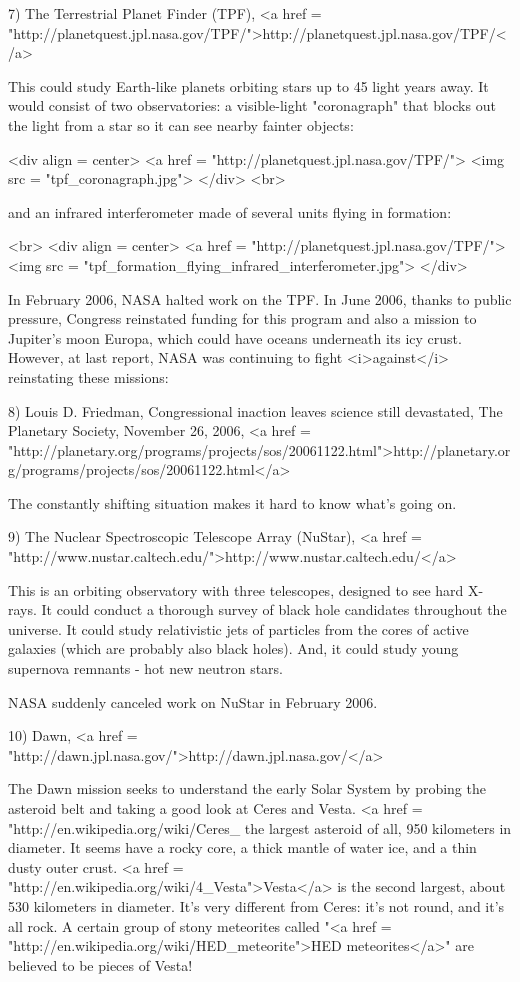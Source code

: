 7) The Terrestrial Planet Finder (TPF),
<a href = "http://planetquest.jpl.nasa.gov/TPF/">http://planetquest.jpl.nasa.gov/TPF/</a>

This could study Earth-like planets orbiting stars up to 45 light
years away.  It would consist of two observatories: a visible-light
"coronagraph" that blocks out the light from a star so it
can see nearby fainter objects:

<div align = center>
<a href = "http://planetquest.jpl.nasa.gov/TPF/">
<img src = "tpf_coronagraph.jpg">
</div>
<br>

and an infrared interferometer made of
several units flying in formation:

<br>
<div align = center>
<a href = "http://planetquest.jpl.nasa.gov/TPF/">
<img src = "tpf_formation_flying_infrared_interferometer.jpg">
</div>

In February 2006, NASA halted work on the TPF.  In June 2006, thanks
to public pressure, Congress reinstated funding for this
program and also a mission to Jupiter's moon Europa, which could have
oceans underneath its icy crust.  However, at last report, NASA was
continuing to fight <i>against</i> reinstating these missions:

8) Louis D. Friedman, Congressional inaction leaves science still
devastated, The Planetary Society, November 26, 2006, 
<a href = "http://planetary.org/programs/projects/sos/20061122.html">http://planetary.org/programs/projects/sos/20061122.html</a>

The constantly shifting situation makes it hard to know what's
going on.

9) The Nuclear Spectroscopic Telescope Array (NuStar),
<a href = "http://www.nustar.caltech.edu/">http://www.nustar.caltech.edu/</a>

This is an orbiting observatory with three telescopes, designed to see 
hard X-rays.   It could conduct a thorough survey of black hole candidates
throughout the universe.  It could study relativistic jets of particles 
from the cores of active galaxies (which are probably also black holes).
And, it could study young supernova remnants - hot new neutron stars.

NASA suddenly canceled work on NuStar in February 2006.

10) Dawn, <a href = "http://dawn.jpl.nasa.gov/">http://dawn.jpl.nasa.gov/</a>

The Dawn mission seeks to understand the early Solar System by probing
the asteroid belt and taking a good look at Ceres and Vesta.  <a href
= "http://en.wikipedia.org/wiki/Ceres_%
the largest asteroid of all, 950 kilometers in diameter.  It
seems have a rocky core, a thick mantle of water ice, and a thin dusty
outer crust.  <a href = "http://en.wikipedia.org/wiki/4_Vesta">Vesta</a> is the second
largest, about 530 kilometers in diameter.  It's very different from
Ceres: it's not round, and it's all rock.  A certain group of stony
meteorites called "<a href =
"http://en.wikipedia.org/wiki/HED_meteorite">HED meteorites</a>"
are believed to be pieces of Vesta!

